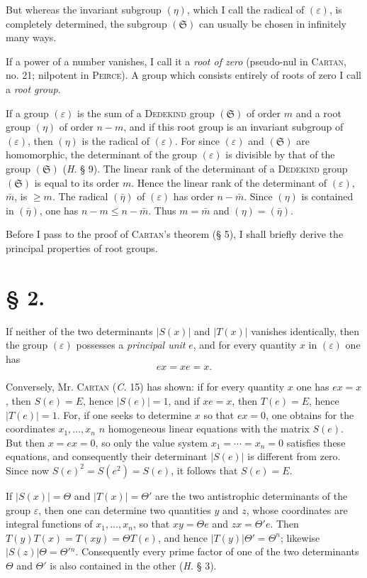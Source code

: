 \documentclass[11pt]{article}
\newcommand{\eps}{\varepsilon}
\newcommand{\grS}{\mathfrak{S}}
\begin{document}
But whereas the invariant subgroup $(\eta)$, which I call the radical of $(\eps)$, is completely determined, the subgroup $(\grS)$ can usually be chosen in infinitely many ways.

If a power of a number vanishes, I call it a \emph{root of zero} (pseudo-nul in \textsc{Cartan}, no. 21; nilpotent in \textsc{Peirce}). A group which consists entirely of roots of zero I call a \emph{root group}.

If a group $(\eps)$ is the sum of a \textsc{Dedekind} group $(\grS)$ of order $m$ and a root group $(\eta)$ of order $n-m$, and if this root group is an invariant subgroup of $(\eps)$, then $(\eta)$ is the radical of $(\eps)$. For since $(\eps)$ and $(\grS)$ are homomorphic, the determinant of the group $(\eps)$ is divisible by that of the group $(\grS)$ (\emph{H.} § 9). The linear rank of the determinant of a \textsc{Dedekind} group $(\grS)$ is equal to its order $m$. Hence the linear rank of the determinant of $(\eps)$, $\bar m$, is $\geq m$. The radical $(\bar\eta)$ of $(\eps)$ has order $n-\bar m$. Since $(\eta)$ is contained in $(\bar\eta)$, one has $n-m\leq n-\bar m$. Thus $m=\bar m$ and $(\eta)=(\bar\eta)$.

Before I pass to the proof of \textsc{Cartan}'s theorem (§ 5), I shall briefly derive the principal properties of root groups.

\section*{§ 2.}

If neither of the two determinants $|S(x)|$ and $|T(x)|$ vanishes identically, then the group $(\eps)$ possesses a \emph{principal unit} $e$, and for every quantity $x$ in $(\eps)$ one has
\begin{equation}\tag{1.}
 ex=xe=x.
\end{equation}

Conversely, Mr. \textsc{Cartan} (\emph{C.} 15) has shown: if for every quantity $x$ one has $ex=x$, then $S(e)=E$, hence $|S(e)|=1$, and if $xe=x$, then $T(e)=E$, hence $|T(e)|=1$. For, if one seeks to determine $x$ so that $ex=0$, one obtains for the coordinates $x_1,\ldots,x_n$ $n$ homogeneous linear equations with the matrix $S(e)$. But then $x=ex=0$, so only the value system $x_1=\cdots=x_n=0$ satisfies these equations, and consequently their determinant $|S(e)|$ is different from zero. Since now $S(e)^2=S(e^2)=S(e)$, it follows that $S(e)=E$.

If $|S(x)|=\Theta$ and $|T(x)|=\Theta'$ are the two antistrophic determinants of the group $\eps$, then one can determine two quantities $y$ and $z$, whose coordinates are integral functions of $x_1,\ldots,x_n$, so that $xy=\Theta e$ and $zx=\Theta'e$. Then $T(y)T(x)=T(xy)=\Theta T(e)$, and hence $|T(y)|\Theta'=\Theta^n$; likewise $|S(z)|\Theta=\Theta'{}^n$. Consequently every prime factor of one of the two determinants $\Theta$ and $\Theta'$ is also contained in the other (\emph{H.} § 3).
\end{document}
